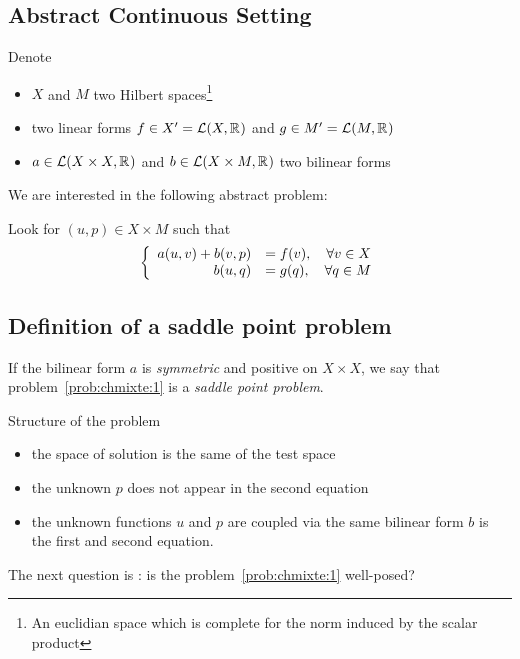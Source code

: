 \subsection{Abstract Continuous Setting}
  Denote
  \begin{itemize}
  \item $X$ and $M$ two Hilbert spaces\footnote{An euclidian space which is
  complete for the norm induced by the scalar product}
  \item two linear forms $f \in X'=\mathcal{L}(X, \mathbb R^{})$ and $g \in
    M'=\mathcal{L}(M, \mathbb R^{})$
  \item $a \in \mathcal{L}(X\times X, \mathbb R^{})$ and $b \in \mathcal{L}(X\times M,
    \mathbb R^{})$ two bilinear forms
  \end{itemize}
  We are interested in the following abstract problem:
  \begin{problem}
    \label{prob:chmixte:1}
    Look for $(u,p) \in X \times M$ such that
    \begin{equation}
      \label{eq:chmixte:4}
      \left\{
        \begin{array}[c]{rl}
          a(u,v) + b(v,p) & = f(v), \quad \forall v \in X\\
          b(u,q) & = g(q), \quad \forall q \in M
        \end{array}
      \right.
    \end{equation}
  \end{problem}



\subsection{Definition of a saddle point problem}
  \begin{definition}
    \label{def:chmixte:1}
    If the bilinear form $a$ is \emph{symmetric} and positive on $X\times X$, we
    say that problem~\ref{prob:chmixte:1} is a \emph{saddle point problem}.
  \end{definition}

  \begin{remark}{Structure of the problem}
    \begin{itemize}
    \item the space of solution is the same of the test space
    \item the unknown $p$ does not appear in the second equation
    \item the unknown functions $u$ and $p$ are coupled via the same bilinear
      form $b$ is the first and second equation.
    \end{itemize}
    The next question is : \alert{is the problem~\ref{prob:chmixte:1} well-posed?}
  \end{remark}

